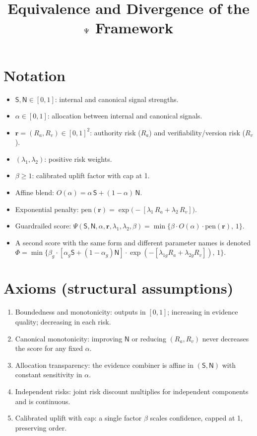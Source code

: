 \documentclass[11pt]{article}
\title{Equivalence and Divergence of the \texorpdfstring{$\score$}{Psi} Framework}
\author{}
\date{}
\newcommand{\Ssig}{\mathsf{S}}
\newcommand{\Nsig}{\mathsf{N}}
\newcommand{\alloc}{\alpha}
\newcommand{\riskvec}{\mathbf{r}}
\newcommand{\rA}{R_a}
\newcommand{\rV}{R_v}
\newcommand{\lA}{\lambda_1}
\newcommand{\lV}{\lambda_2}
\newcommand{\uplift}{\beta}
\newcommand{\pen}{\mathrm{pen}}
\newcommand{\blend}{O}
\newcommand{\score}{\Psi}
\newcommand{\gscore}{\Phi}
\begin{document}
\maketitle

\section*{Notation}
\begin{itemize}[leftmargin=1.4em]
  \item $\Ssig,\Nsig\in[0,1]$: internal and canonical signal strengths.
  \item $\alloc\in[0,1]$: allocation between internal and canonical signals.
  \item $\riskvec=(\rA,\rV)\in[0,1]^2$: authority risk ($\rA$) and verifiability/version risk ($\rV$).
  \item $(\lA,\lV)$: positive risk weights.
  \item $\uplift\ge 1$: calibrated uplift factor with cap at 1.
  \item Affine blend: $\blend(\alloc)=\alloc\,\Ssig+(1-\alloc)\,\Nsig$.
  \item Exponential penalty: $\pen(\riskvec)=\exp\!\big(-[\lA\,\rA+\lV\,\rV]\big)$.
  \item Guardrailed score: $\score(\Ssig,\Nsig,\alloc,\riskvec,\lA,\lV,\uplift)=\min\{\uplift\cdot \blend(\alloc)\cdot \pen(\riskvec),\,1\}$.
  \item A second score with the same form and different parameter names is denoted
  $\gscore=\min\{\beta_g\cdot[\alpha_g \Ssig+(1-\alpha_g)\Nsig]\cdot \exp(-[\lambda_{1g}\rA+\lambda_{2g}\rV]),\,1\}$.
\end{itemize}

\section*{Axioms (structural assumptions)}
\begin{enumerate}[leftmargin=1.4em,label=A\arabic*:]
  \item Boundedness and monotonicity: outputs in $[0,1]$; increasing in evidence quality; decreasing in each risk.
  \item Canonical monotonicity: improving $\Nsig$ or reducing $(\rA,\rV)$ never decreases the score for any fixed $\alloc$.
  \item Allocation transparency: the evidence combiner is affine in $(\Ssig,\Nsig)$ with constant sensitivity in $\alloc$.
  \item Independent risks: joint risk discount multiplies for independent components and is continuous.
  \item Calibrated uplift with cap: a single factor $\uplift$ scales confidence, capped at 1, preserving order.
\end{enumerate}
\end{document}
